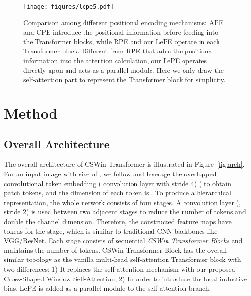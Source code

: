 \documentclass[10pt,twocolumn,letterpaper]{article}
\begin{document}
\begin{figure*}[t]
\centering
\texttt{[image: figures/lepe5.pdf]} 
\vspace{-3mm}
\caption{Comparison among different positional encoding mechanisms: APE and CPE introduce the positional information before feeding into the Transformer blocks, while RPE and our LePE operate in each Transformer block. Different from RPE that adds the positional information into the attention calculation, our LePE operates directly upon  and acts as a parallel module. { Here we only draw the self-attention part to represent the Transformer block for simplicity.}}
\label{fig:pe_cmp}
\vspace{-4mm}
\end{figure*}



\vspace{-1mm}
\section{Method}
\vspace{-1mm}
\subsection{Overall Architecture}
\vspace{-1mm}

The overall architecture of CSWin Transformer is illustrated in Figure~\ref{fig:arch}. For an input image with size of , we follow \cite{wu2021cvt} and leverage  the overlapped convolutional token embedding ( convolution layer with stride 4) ) to obtain  patch tokens, and the dimension of each token is .
To produce a hierarchical representation, the whole network consists of four stages. A convolution layer (, stride 2) is used between two adjacent stages to reduce the number of tokens and double the channel dimension. Therefore, the constructed feature maps have   tokens for the  stage, which is similar to traditional 
CNN backbones like VGG/ResNet. Each stage consists of  sequential \emph{CSWin Transformer Blocks} and maintains the number of tokens. CSWin Transformer Block has the overall similar topology as the vanilla multi-head self-attention Transformer block with two differences: 1) It replaces the self-attention mechanism with our proposed Cross-Shaped Window Self-Attention; 2) In order to introduce the local inductive bias, LePE is added as a parallel module to the self-attention branch.
\end{document}
